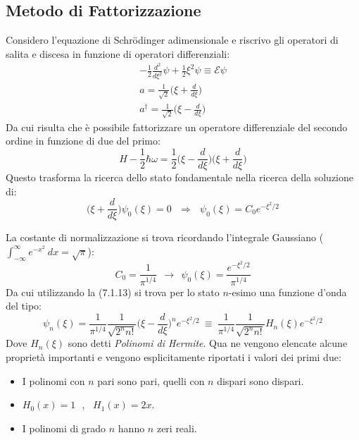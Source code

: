 \documentclass[twoside]{article}
\begin{document}
\subsection{Metodo di Fattorizzazione}
Considero l'equazione di Schr\"odinger adimensionale e riscrivo gli operatori di salita e discesa in funzione di operatori differenziali:
\begin{equation}
    \begin{split}
        -\frac{1}{2}\frac{d^2}{d\xi^2}\psi+\frac{1}{2}\xi^2\psi\equiv\mathcal{E}\psi
        \\
        a=\frac{1}{\sqrt{2}}\biggl( \xi + \frac{d}{d\xi} \biggr)
        \\
        a^{\dagger}=\frac{1}{\sqrt{2}}\biggl( \xi - \frac{d}{d\xi} \biggr)
    \end{split}
\end{equation}
Da cui risulta che è possibile fattorizzare un operatore differenziale del secondo ordine in funzione di due del primo:
\begin{equation}
    H-\frac{1}{2}\hbar \omega=\frac{1}{2} \biggl( \xi - \frac{d}{d\xi} \biggr) \biggl( \xi + \frac{d}{d\xi} \biggr)
\end{equation}
Questo trasforma la ricerca dello stato fondamentale nella ricerca della soluzione di:
\begin{equation}
    \biggl( \xi + \frac{d}{d\xi} \biggr)\psi_0(\xi) = 0 \ \ \ \Rightarrow \ \ \ \psi_0(\xi)=C_0 e^{-\xi^2/2}
\end{equation}

La costante di normalizzazione si trova ricordando l'integrale Gaussiano ($\int_{-\infty}^{\infty}e^{-x^2} \ dx = \sqrt{\pi}$):
\begin{equation}
    C_0=\frac{1}{\pi^{1/4}} \ \ \rightarrow \ \ \psi_0(\xi)=\frac{e^{-\xi^2/2}}{\pi^{1/4}}
\end{equation}
Da cui utilizzando la (7.1.13) si trova per lo stato $n$-esimo una funzione d'onda del tipo:
\begin{equation}
    \psi_n(\xi)=\frac{1}{\pi^{1/4}}\frac{1}{\sqrt{2^n n!}}\biggl( \xi - \frac{d}{d\xi} \biggr)^n e^{-\xi^2/2} \ \equiv \ \frac{1}{\pi^{1/4}}\frac{1}{\sqrt{2^n n!}}H_n(\xi) e^{-\xi^2/2}
\end{equation}
Dove $H_n(\xi)$ sono detti \textit{Polinomi di Hermite}. Qua ne vengono elencate alcune proprietà importanti e vengono esplicitamente riportati i valori dei primi due:
\begin{itemize}
    \item I polinomi con $n$ pari sono pari, quelli con $n$ dispari sono dispari.
    \item $H_0(x)=1 \ \ \ , \ \ \ H_1(x)=2x$.
    \item I polinomi di grado $n$ hanno $n$ zeri reali.
\end{itemize}
\end{document}

